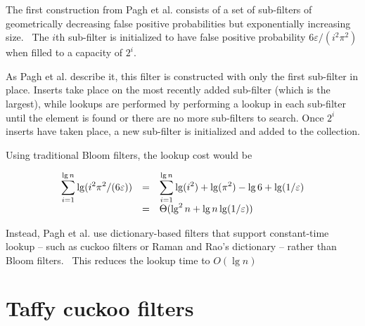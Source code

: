 \documentclass[sigconf, nonacm]{acmart}
\newcommand{\etal}{et al.}
\begin{document}
The first construction from Pagh \etal{} consists of a set of sub-filters of geometrically decreasing false positive probabilities but exponentially increasing size.~\cite{psw}
The $i$th sub-filter is initialized to have false positive probability $6 \varepsilon/(i^2 \pi^2)$ when filled to a capacity of $2^i$.

As Pagh \etal{} describe it, this filter is constructed with only the first sub-filter in place.
Inserts take place on the most recently added sub-filter (which is the largest), while lookups are performed by performing a lookup in each sub-filter until the element is found or there are no more sub-filters to search.
Once $2^i$ inserts have taken place, a new sub-filter is initialized and added to the collection.

Using traditional Bloom filters, the lookup cost would be

\[
\begin{array}{r c l}
\displaystyle\sum_{i=1}^{\lg n} \lg (i^2 \pi^2 /(6 \varepsilon)) & = &
 \displaystyle\sum_{i=1}^{\lg n} \lg (i^2) + \lg( \pi^2) - \lg 6 + \lg (1/\varepsilon) \\
& = & \Theta(\lg^2 n + \lg n \lg (1/\varepsilon))
\end{array}
\]

Instead, Pagh \etal{} use dictionary-based filters that support constant-time lookup -- such as cuckoo filters or Raman and Rao's dictionary -- rather than Bloom filters.~\cite{succinct,psw}
This reduces the lookup time to $O(\lg n)$


\section{Taffy cuckoo filters}
\label{tcf}

\end{document}
